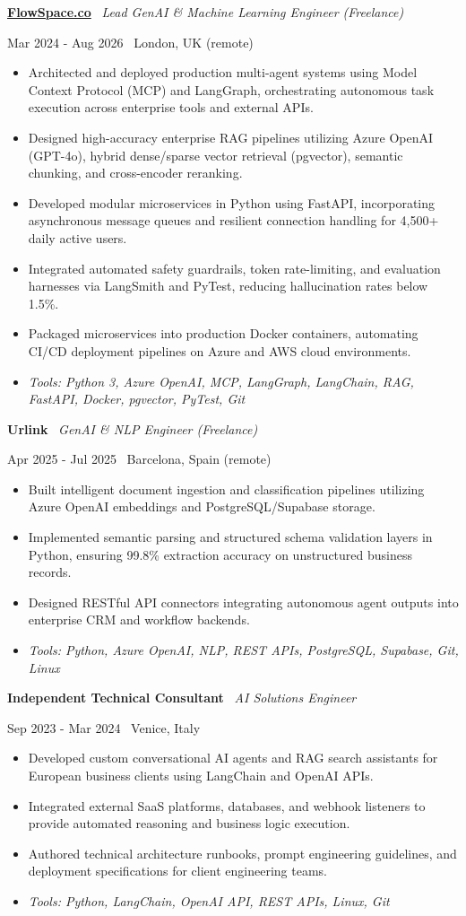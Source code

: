 \documentclass[a4paper,10pt]{article}
\newcommand{\role}[4]{%
  \vspace{2pt}\noindent
  \begin{minipage}[t]{0.70\textwidth}\raggedright\textbf{#1} \textbullet\ \textit{#3}\end{minipage}%
  \hfill
  \begin{minipage}[t]{0.28\textwidth}\raggedleft\footnotesize\color{gray}#2 \textbullet\ #4\end{minipage}%
  \vspace{1pt}%
}
\begin{document}
\role{\href{https://flowspace.co}{FlowSpace.co}}{Mar 2024 - Aug 2026}{Lead GenAI \& Machine Learning Engineer (Freelance)}{London, UK (remote)}
\begin{itemize}
  \item Architected and deployed production multi-agent systems using Model Context Protocol (MCP) and LangGraph, orchestrating autonomous task execution across enterprise tools and external APIs.
  \item Designed high-accuracy enterprise RAG pipelines utilizing Azure OpenAI (GPT-4o), hybrid dense/sparse vector retrieval (pgvector), semantic chunking, and cross-encoder reranking.
  \item Developed modular microservices in Python using FastAPI, incorporating asynchronous message queues and resilient connection handling for 4,500+ daily active users.
  \item Integrated automated safety guardrails, token rate-limiting, and evaluation harnesses via LangSmith and PyTest, reducing hallucination rates below 1.5\%.
  \item Packaged microservices into production Docker containers, automating CI/CD deployment pipelines on Azure and AWS cloud environments.
  \item \textit{Tools: Python 3, Azure OpenAI, MCP, LangGraph, LangChain, RAG, FastAPI, Docker, pgvector, PyTest, Git}
\end{itemize}

\role{Urlink}{Apr 2025 - Jul 2025}{GenAI \& NLP Engineer (Freelance)}{Barcelona, Spain (remote)}
\begin{itemize}
  \item Built intelligent document ingestion and classification pipelines utilizing Azure OpenAI embeddings and PostgreSQL/Supabase storage.
  \item Implemented semantic parsing and structured schema validation layers in Python, ensuring 99.8\% extraction accuracy on unstructured business records.
  \item Designed RESTful API connectors integrating autonomous agent outputs into enterprise CRM and workflow backends.
  \item \textit{Tools: Python, Azure OpenAI, NLP, REST APIs, PostgreSQL, Supabase, Git, Linux}
\end{itemize}

\role{Independent Technical Consultant}{Sep 2023 - Mar 2024}{AI Solutions Engineer}{Venice, Italy}
\begin{itemize}
  \item Developed custom conversational AI agents and RAG search assistants for European business clients using LangChain and OpenAI APIs.
  \item Integrated external SaaS platforms, databases, and webhook listeners to provide automated reasoning and business logic execution.
  \item Authored technical architecture runbooks, prompt engineering guidelines, and deployment specifications for client engineering teams.
  \item \textit{Tools: Python, LangChain, OpenAI API, REST APIs, Linux, Git}
\end{itemize}
\end{document}
